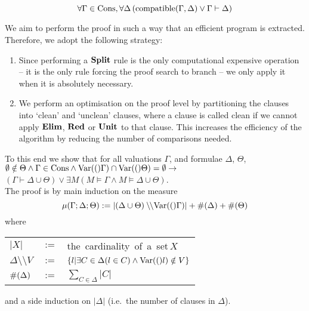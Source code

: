 \begin{comment}
We reformulate this as the following classically equivalent but constructively
stronger statement:
   $$\forall \Gamma,\Delta ( \compatible{\Gamma}{\Delta} \vee \Gamma \vdash \Delta)$$
While a proof of the former statement would only yield a program that
computes a DPLL proof for unsatisfiable formulae, the latter statement
yields in addition a model if $\Gamma$ and $\Delta$ are compatible.
\end{comment}
\medskip
\begin{mytheorem} 
\label{thm:dpllcompleteness}
$$ \forall \Gamma\in\mathrm{Cons}, \forall \Delta\,
     (\mathrm{compatible}(\Gamma,\Delta)  \lor  \Gamma \vdash \Delta) $$

\proof
{\rm
We aim to perform the proof in such a way that an efficient program 
is extracted. Therefore, we adopt the following strategy:
%
\begin{enumerate}
 \item Since performing a $\mathbf{Split}$ rule is the only computational expensive 
    operation
     -- it is the only rule forcing the proof search to branch -- we only
    apply it when it is absolutely necessary.

 \item  We perform an optimisation on the proof level by partitioning the clauses
    into `clean' and `unclean' clauses, where a clause is called clean if we
    cannot apply $\mathbf{Elim}$, $\mathbf{Red}$ or $\mathbf{Unit}$ to that clause.
    This increases the efficiency of the algorithm by reducing the number
    of comparisons needed.
\end{enumerate}
%
To this end we show that for all valuations $\Gamma$, and formulae $\Delta$, $\Theta$,\\[1em]
%
\hspace*{3em}$\emptyset \notin \Theta \wedge 
\Gamma\in\mathrm{Cons} \land \mathrm{Var}(()\Gamma) \cap \mathrm{Var}(()\Theta) = \emptyset\to$\\[.5em]
\hspace*{12em}$(\Gamma \vdash  \Delta\cup\Theta) \lor 
 \exists M(M \models \Gamma \land M \models \Delta\cup\Theta)$.\\[1em]
%
The proof is by main induction on the measure
%
$$\mu(\Gamma;\Delta;\Theta) := |(\Delta\cup\Theta) \setminus\!\!\setminus \mathrm{Var}(()\Gamma)|+
\#(\Delta)+\#(\Theta)$$
%
where
%
\begin{center}
\begin{tabular}{lll}
$|X|$             &$:=$& \hbox{the cardinality of a set}\,$X$\\
$\Delta \setminus\!\!\setminus V $
                &$:=$& $\{ l| \exists C\in \Delta(l \in C) \land \mathrm{Var}(()l) \notin V \}$\\
$\#(\Delta) $&$:=$&$ \sum_{C\in\Delta}|C|$ 
\end{tabular}
\end{center}
%
and a side induction on $|\Delta|$ (i.e.~the number of clauses in $\Delta$).
%
\par

}
\end{mytheorem}
